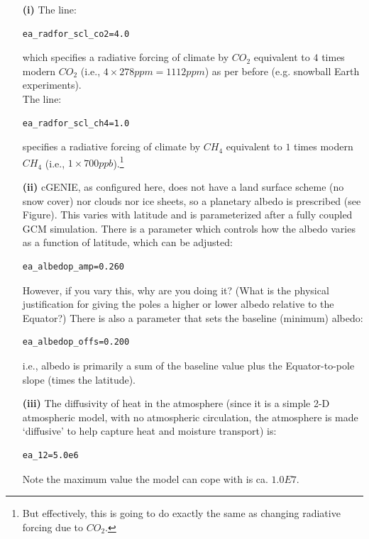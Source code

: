 \documentclass[11pt,fleqn]{book} %
\begin{document}
\begin{itemize}[noitemsep]

\item[\textbf{(i)}] The line: 
\begin{verbatim}
ea_radfor_scl_co2=4.0
\end{verbatim}
which specifies a radiative forcing of climate by \(CO_{2}\) equivalent to \(4\) times modern \(CO_{2}\) (i.e., \(4\times278 ppm = 1112 ppm\)) as per before (e.g. snowball Earth experiments).
\\The line: 
\begin{verbatim}
ea_radfor_scl_ch4=1.0
\end{verbatim}
specifies a radiative forcing of climate by \(CH_{4}\) equivalent to \(1\) times modern \(CH_{4}\) (i.e., \(1\times700 ppb\)).\footnote{But effectively, this is going to do exactly the same as changing radiative forcing due to \(CO_{2}\).}

\item[\textbf{(ii)}] cGENIE, as configured here, does not have a land surface scheme (no snow cover) nor clouds nor ice sheets, so a planetary albedo is prescribed (see Figure). This varies with latitude and is parameterized after a fully coupled GCM simulation. There is a parameter which controls how the albedo varies as a function of latitude, which can be adjusted: 
\begin{verbatim}
ea_albedop_amp=0.260
\end{verbatim}
However, if you vary this, why are you doing it? (What is the physical justification for giving the poles a higher or lower albedo relative to the Equator?)
There is also a parameter that sets the baseline (minimum) albedo: 
\begin{verbatim}
ea_albedop_offs=0.200
\end{verbatim}
i.e., albedo is primarily a sum of the baseline value plus the Equator-to-pole slope (times the latitude).

\item[\textbf{(iii)}] The diffusivity of heat in the atmosphere (since it is a simple 2-D atmospheric model, with no atmospheric circulation, the atmosphere is made ‘diffusive’ to help capture heat and moisture transport) is: 
\begin{verbatim}
ea_12=5.0e6
\end{verbatim}
Note the maximum value the model can cope with is ca. \(1.0E7\).

\end{itemize}
\end{document}
